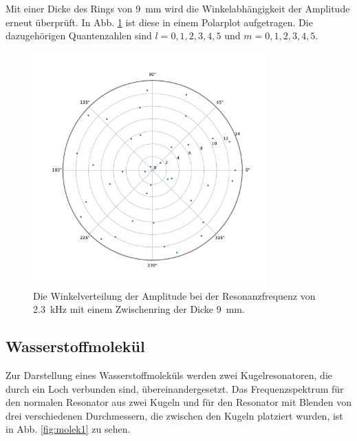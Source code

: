 Mit einer Dicke des Rings von \SI{9}{\milli\meter} wird die Winkelabhängigkeit der Amplitude erneut überprüft.
In Abb. \ref{fig:polar2} ist diese in einem Polarplot aufgetragen. Die dazugehörigen Quantenzahlen sind $l = 0, 1,2,3,4,5$ und $ m = 0, 1, 2,3,4,5$. 

\begin{figure}
    \centering
    \includegraphics[width=0.8\textwidth]{plots/C_polar5.pdf}
    \caption{Die Winkelverteilung der Amplitude bei der Resonanzfrequenz von \SI{2.3}{\kilo\hertz} mit einem Zwischenring der Dicke \SI{9}{\milli\metre}.}
    \label{fig:polar2}
\end{figure}

\subsection{Wasserstoffmolekül}

Zur Darstellung eines Wasserstoffmoleküls werden zwei Kugelresonatoren, die durch ein Loch verbunden sind, übereinandergesetzt.
Das Frequenzspektrum für den normalen Resonator aus zwei Kugeln und für den Resonator mit Blenden von drei verschiedenen Durchmessern, die zwischen den Kugeln platziert wurden, ist in Abb. \ref{fig:molek1} zu sehen.

